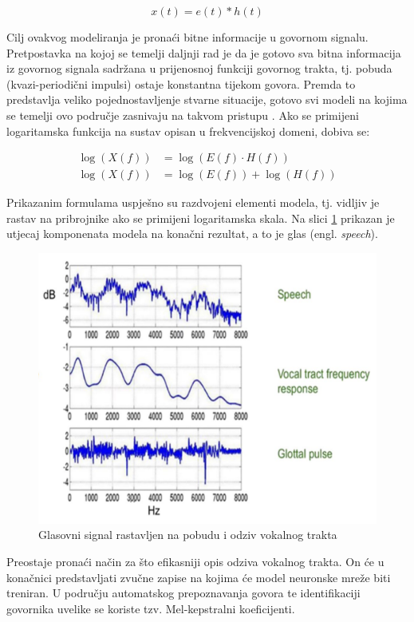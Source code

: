 \begin{equation}
    x(t) = e(t) \ast h(t)
    \label{eq:govor_vremenska}
\end{equation}

Cilj ovakvog modeliranja je pronaći bitne informacije u govornom signalu. Pretpostavka na
kojoj se temelji daljnji rad je da je gotovo sva bitna informacija iz govornog signala sadržana
u prijenosnoj funkciji govornog trakta, tj. pobuda (kvazi-periodični impulsi) ostaje
konstantna tijekom govora. Premda to predstavlja veliko pojednostavljenje stvarne situacije, gotovo svi modeli na kojima se temelji ovo područje zasnivaju na takvom pristupu \cite{multiplier, emotion, sidhu2024mfcc}.
Ako se primijeni logaritamska funkcija na
sustav opisan u frekvencijskoj domeni, dobiva se:

\begin{equation}
    \label{eq:logaritam}
    \begin{aligned}
        \log(X(f)) &= \log(E(f) \cdot H(f)) \\
        \log(X(f)) &= \log(E(f)) + \log(H(f))
    \end{aligned}
\end{equation}

Prikazanim formulama uspješno su razdvojeni elementi modela, tj. vidljiv je rastav na pribrojnike
ako se primijeni logaritamska skala. Na slici \ref{pic:rastav} prikazan je utjecaj
komponenata modela na konačni rezultat, a to je glas (engl. \textit{speech}). 

\begin{figure}[htb]
    \centering
    \includegraphics[width=0.6\linewidth]{Chapters/struktura_sustava/generiranje_znacajki/log.png} 
    \caption{Glasovni signal rastavljen na pobudu i odziv vokalnog trakta \cite{sidhu2024mfcc}}
    \label{pic:rastav}
\end{figure}

Preostaje pronaći način za što efikasniji opis odziva vokalnog trakta. On će
u konačnici predstavljati zvučne zapise na kojima će model neuronske mreže biti treniran.
U području automatskog prepoznavanja govora te identifikaciji govornika uvelike se koriste
tzv. Mel-kepstralni koeficijenti.


